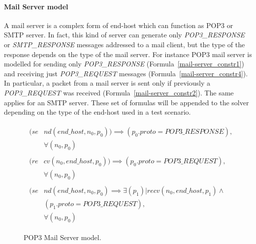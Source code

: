 \paragraph{Mail Server model} A mail server is a complex form of end-host which can function as POP3 or SMTP server. In fact, this kind of server can generate only \textit{POP3\_RESPONSE} or \textit{SMTP\_RESPONSE} messages addressed to a mail client, but the type of the response depends on the type of the mail server. For instance POP3 mail server is modelled for sending only \textit{POP3\_RESPONSE} (Formula~\ref{mail-server_constr1}) and  receiving just \textit{POP3\_REQUEST} messages (Formula~\ref{mail-server_constr4}). In particular, a packet from a mail server is sent only if previously a \textit{POP3\_REQUEST} was received (Formula~\ref{mail-server_constr2}). The same applies for an SMTP server. These set of formulas will be appended to the solver depending on the type of the end-host used in a test scenario. 
\begin{figure}[h]
	{\footnotesize
		\begin{subequations}
			\begin{align}
				\begin{split}
					\label{mail-server_constr1}
					(se& nd(end\_host , n_{0}, p_{0})) \implies  (p_{0}.proto = POP3\_RESPONSE ), \\
					& \forall (n_{0}, p_{0})
				\end{split} \\							
				\begin{split}
					\label{mail-server_constr4}
					(re& cv(n_{0}, end\_host, p_{0})) \implies (p_{0}.proto = POP3\_REQUEST ), \\
					& \forall (n_{0}, p_{0})
				\end{split}\\	
				\begin{split}
					\label{mail-server_constr2}
					(se& nd(end\_host , n_{0}, p_{0}) \implies \exists (p_{1}) | recv(n_{0}, end\_host, p_{1}) \wedge\\
					&    (p_{1}.proto = POP3\_REQUEST),\\
					& \forall (n_{0}, p_{0})
				\end{split} 
			\end{align}
		\end{subequations}
	}%
	\caption{POP3 Mail Server model.}
	\label{mail-server_model}
\end{figure}

